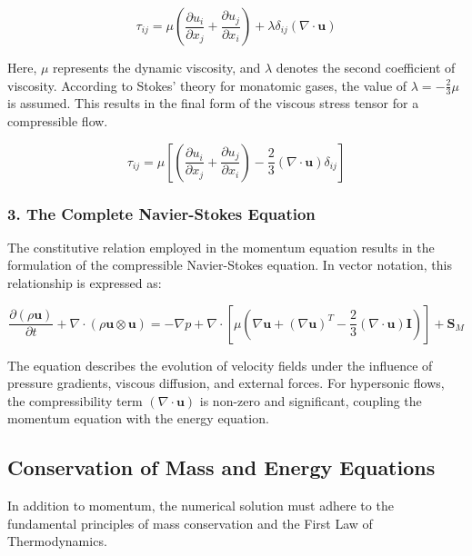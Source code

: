 \begin{equation}
    \tau_{ij} = \mu \left( \frac{\partial u_i}{\partial x_j} + \frac{\partial u_j}{\partial x_i} \right) + \lambda \delta_{ij} (\nabla \cdot \mathbf{u})
\end{equation}

Here, $\mu$ represents the dynamic viscosity, and $\lambda$ denotes the second coefficient of viscosity. According to Stokes' theory for monatomic gases, the value of $\lambda = -\frac{2}{3}\mu$is assumed. This results in the final form of the viscous stress tensor for a compressible flow.

\begin{equation}
    \tau_{ij} = \mu \left[ \left( \frac{\partial u_i}{\partial x_j} + \frac{\partial u_j}{\partial x_i} \right) - \frac{2}{3} (\nabla \cdot \mathbf{u}) \delta_{ij} \right]
\end{equation}

\subsubsection*{3. The Complete Navier-Stokes Equation}
The constitutive relation employed in the momentum equation results in the formulation of the compressible Navier-Stokes equation. In vector notation, this relationship is expressed as:

\begin{equation}
    \frac{\partial (\rho \mathbf{u})}{\partial t} + \nabla \cdot (\rho \mathbf{u} \otimes \mathbf{u}) = -\nabla p + \nabla \cdot \left[ \mu \left( \nabla \mathbf{u} + (\nabla \mathbf{u})^T - \frac{2}{3} (\nabla \cdot \mathbf{u}) \mathbf{I} \right) \right] + \mathbf{S}_M
\end{equation}

The equation describes the evolution of velocity fields under the influence of pressure gradients, viscous diffusion, and external forces. For hypersonic flows, the compressibility term $(\nabla \cdot \mathbf{u})$ is non-zero and significant, coupling the momentum equation with the energy equation.


\subsection{Conservation of Mass and Energy Equations}

In addition to momentum, the numerical solution must adhere to the fundamental principles of mass conservation and the First Law of Thermodynamics.

